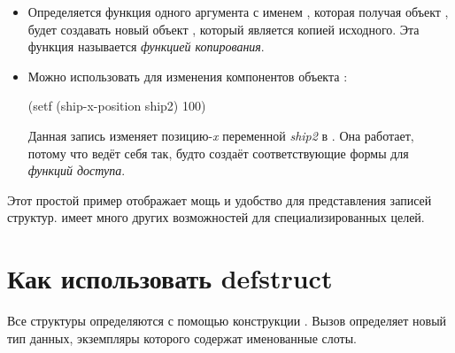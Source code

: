 \begin{itemize}
\item 
Определяется функция одного аргумента с именем , которая получая
объект , будет создавать новый объект , который является
копией исходного.
Эта функция называется \emph{функцией копирования}.

\item 
Можно использовать  для изменения компонентов объекта :
\begin{lisp}
(setf (ship-x-position ship2) 100)
\end{lisp}
Данная запись изменяет позицию-\emph{x} переменной \emph{ship2} в .
Она работает, потому что  ведёт себя так, будто создаёт
соответствующие  формы для \emph{функций доступа}.
\end{itemize}

Этот простой пример отображает мощь и удобство  для представления
записей структур.
 имеет много других возможностей для специализированных целей.

\section{Как использовать defstruct}

Все структуры определяются с помощью конструкции .
Вызов  определяет новый тип данных, экземпляры которого содержат
именованные слоты.

